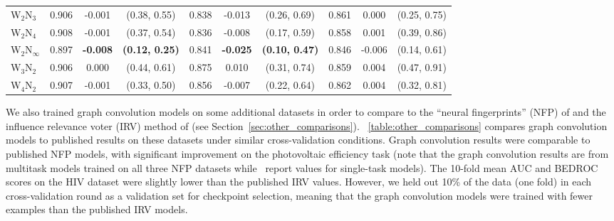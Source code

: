 {\begin{landscape}
\begin{table}[htb]
\begin{tabular}{ l S S c S S c S S c }
    W$_2$N$_3$ & 0.906 & -0.001 & (\num{0.38}, \num{0.55}) & 0.838 & -0.013 & (\num{0.26}, \num{0.69}) & 0.861 & 0.000 & (\num{0.25}, \num{0.75}) \\
    W$_2$N$_4$ & 0.908 & -0.001 & (\num{0.37}, \num{0.54}) & 0.836 & -0.008 & (\num{0.17}, \num{0.59}) & 0.858 & 0.001 & (\num{0.39}, \num{0.86}) \\
    W$_2$N$_\infty$ & 0.897 & \bfseries \color{red} -0.008 & \bfseries \color{red} (\num{0.12}, \num{0.25}) & 0.841 & \bfseries \color{red} -0.025 & \bfseries \color{red} (\num{0.10}, \num{0.47}) & 0.846 & -0.006 & (\num{0.14}, \num{0.61}) \\
    W$_3$N$_2$ & 0.906 & 0.000 & (\num{0.44}, \num{0.61}) & 0.875 & 0.010 & (\num{0.31}, \num{0.74}) & 0.859 & 0.004 & (\num{0.47}, \num{0.91}) \\
    W$_4$N$_2$ & 0.907 & -0.001 & (\num{0.33}, \num{0.50}) & 0.856 & -0.007 & (\num{0.22}, \num{0.64}) & 0.862 & 0.004 & (\num{0.32}, \num{0.81}) \\
    \bottomrule
    \end{tabular}
\end{table}
\vspace*{\fill}
\end{landscape}
}

We also trained graph convolution models on some additional datasets in order to
compare to the ``neural fingerprints'' (NFP) of
\citet{duvenaud2015convolutional} and the influence relevance voter (IRV) method
of \citet{swamidass2009influence} (see Section~\ref{sec:other_comparisons}).
\tablename~\ref{table:other_comparisons} compares graph convolution models to
published results on these datasets under similar cross-validation conditions.
Graph convolution results were comparable to published NFP models, with
significant improvement on the photovoltaic efficiency task (note that the graph
convolution results are from multitask models trained on all three NFP datasets
while~\citet{duvenaud2015convolutional} report values for single-task models).
The 10-fold mean AUC and BEDROC scores on the HIV dataset were slightly lower than the published
IRV values. However, we held out 10\% of the data (one fold) in each
cross-validation round as a validation set for checkpoint selection, meaning
that the graph convolution models were trained with fewer examples than the
published IRV models.

